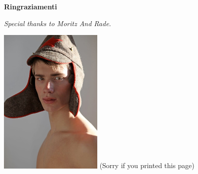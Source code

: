 \thispagestyle{empty}

\begin{center}
  {\bf \Huge Ringraziamenti}
\end{center}

\vspace{4cm}


\emph{
  Special thanks to Moritz And Rade.
}

 \includegraphics[width=50mm,scale=0.5]{moritz-mitterbauer.jpg}
	(Sorry if you printed this page)
